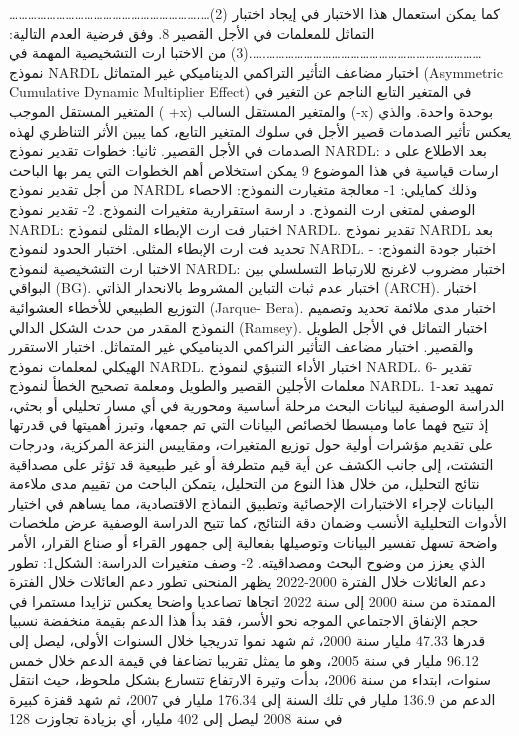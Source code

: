 \documentclass[12pt,a4paper]{report}
\begin{document}
 …………………………………………………….…(2)
     كما یمكن استعمال هذا الاختبار في إیجاد اختبار التماثل للمعلمات في الأجل القصیر 8. وفق فرضیة العدم التالیة: 
 …………………………………………………………….….(3)
     من الاختبا ارت التشخیصیة المهمة في نموذج NARDL اختبار مضاعف التأثیر التراكمي الدینامیكي غیر المتماثل (Asymmetric  Cumulative  Dynamic  Multiplier  Effect) في المتغیر التابع الناجم عن التغیر في المتغیر المستقل الموجب ( +x) والمتغیر المستقل السالب (-x) بوحدة واحدة. والذي یعكس تأثیر الصدمات قصیر الأجل في سلوك المتغیر التابع، كما یبین الأثر التناظري لهذه الصدمات في الأجل القصیر.  
ثانیا: خطوات تقدیر نموذج NARDL: 
    بعد الاطلاع على د ارسات قیاسیة في هذا الموضوع 9 یمكن استخلاص أهم الخطوات التي یمر بها الباحث من أجل تقدیر نموذج NARDL وذلك كمایلي: 
1- معالجة متغیارت النموذج: 
الاحصاء الوصفي لمتغی ارت النموذج. 
د ارسة استقرارية متغيرات النموذج. 
2- تقدیر نموذج NARDL: 
اختبار فت ارت الإبطاء المثلى لنموذج NARDL. 
تقدیر نموذج  NARDL بعد تحدید فت ارت الإبطاء المثلى. 
اختبار الحدود لنموذج  NARDL. 
اختبار جودة النموذج: 
- الاختبا ارت التشخیصیة لنموذج NARDL: 
اختبار مضروب لاغرنج للارتباط التسلسلي بین البواقي (BG). 
اختبار عدم ثبات التباین المشروط بالانحدار الذاتي (ARCH). 
اختبار التوزیع الطبیعي للأخطاء العشوائیة (Jarque- Bera). 
اختبار مدى ملائمة تحديد وتصميم النموذج المقدر من حدث الشكل الدالي (Ramsey). 
اختبار التماثل في الأجل الطويل والقصیر. 
اختبار مضاعف التأثیر النراكمي الديناميكي غیر المتماثل. 
اختبار الاستقرر الهیكلي لمعلمات نموذج  NARDL. 
اختبار الأداء التنبؤي لنموذج NARDL. 
6- تقدير معلمات الأجلين القصير والطويل ومعلمة تصحيح الخطأ لنموذج NARDL. 
1-تمهيد
تعد الدراسة الوصفية لبيانات البحث مرحلة أساسية ومحورية في أي مسار تحليلي أو بحثي، إذ تتيح فهما عاما ومبسطا لخصائص البيانات التي تم جمعها، وتبرز أهميتها في قدرتها على تقديم مؤشرات أولية حول توزيع المتغيرات، ومقاييس النزعة المركزية، ودرجات التشتت، إلى جانب الكشف عن أية قيم متطرفة أو غير طبيعية قد تؤثر على مصداقية نتائج التحليل، من خلال هذا النوع من التحليل، يتمكن الباحث من تقييم مدى ملاءمة البيانات لإجراء الاختبارات الإحصائية وتطبيق النماذج الاقتصادية، مما يساهم في اختيار الأدوات التحليلية الأنسب وضمان دقة النتائج، كما تتيح الدراسة الوصفية عرض ملخصات واضحة تسهل تفسير البيانات وتوصيلها بفعالية إلى جمهور القراء أو صناع القرار، الأمر الذي يعزز من وضوح البحث ومصداقيته. 
2- وصف متغيرات الدراسة:
الشكل1: تطور دعم العائلات خلال الفترة 2000-2022
يظهر المنحنى تطور دعم العائلات خلال الفترة الممتدة من سنة 2000 إلى سنة 2022 اتجاها تصاعديا واضحا يعكس تزايدا مستمرا في حجم الإنفاق الاجتماعي الموجه نحو الأسر، فقد بدأ هذا الدعم بقيمة منخفضة نسبيا قدرها 47.33 مليار سنة 2000، ثم شهد نموا تدريجيا خلال السنوات الأولى، ليصل إلى 96.12 مليار في سنة 2005، وهو ما يمثل تقريبا تضاعفا في قيمة الدعم خلال خمس سنوات، ابتداء من سنة 2006، بدأت وتيرة الارتفاع تتسارع بشكل ملحوظ، حيث انتقل الدعم من 136.9 مليار في تلك السنة إلى 176.34 مليار في 2007، ثم شهد قفزة كبيرة في سنة 2008 ليصل إلى 402 مليار، أي بزيادة تجاوزت 128%
\end{document}
